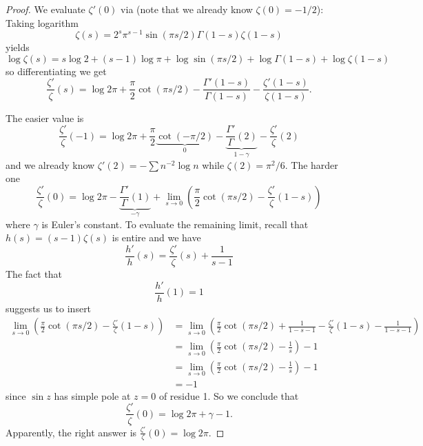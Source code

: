\documentclass[12pt]{article}
\begin{document}
\begin{proof}
We evaluate $\zeta'(0)$ via (note that we already know $\zeta(0) = -1/2$): Taking logarithm
$$\zeta(s) = 2^s \pi^{s - 1} \sin(\pi s / 2) \Gamma(1 - s) \zeta(1 - s)$$
yields
$$\log \zeta(s) = s \log 2 + (s - 1) \log \pi + \log \sin(\pi s / 2) + \log \Gamma(1 - s) + \log \zeta(1 - s)$$
so differentiating we get
$$\frac{\zeta'}{\zeta}(s) = \log 2\pi + \frac\pi2 \cot(\pi s/2) - \frac{\Gamma'(1 - s)}{\Gamma(1 - s)} - \frac{\zeta'(1 - s)}{\zeta(1 - s)}.$$

The easier value is
$$\frac{\zeta'}{\zeta}(-1) = \log 2\pi + \frac\pi2 \underbrace{\cot(-\pi/2)}_0 - \underbrace{\frac{\Gamma'}{\Gamma}(2)}_{1-\gamma} - \frac{\zeta'}{\zeta}(2)$$
and we already know $\zeta'(2) = -\sum n^{-2} \log n$ while $\zeta(2) = \pi^2/6$. The harder one
$$\frac{\zeta'}{\zeta}(0) = \log 2\pi - \underbrace{\frac{\Gamma'}{\Gamma}(1)}_{-\gamma} + \lim_{s \rightarrow 0} \left( \frac\pi2 \cot(\pi s/2) - \frac{\zeta'}{\zeta}(1 - s) \right)$$
where $\gamma$ is Euler's constant. To evaluate the remaining limit, recall that $h(s) = (s - 1)\zeta(s)$ is entire and we have
$$\frac{h'}{h}(s) = \frac{\zeta'}{\zeta}(s) + \frac{1}{s - 1}$$
The fact that
$$\frac{h'}{h}(1) = 1$$
suggests us to insert
\begin{align*}
\lim_{s \rightarrow 0} \left( \frac\pi2 \cot(\pi s/2) - \frac{\zeta'}{\zeta}(1 - s) \right) &= \lim_{s \rightarrow 0} \left( \frac\pi2 \cot(\pi s/2) + \frac{1}{1 - s - 1} - \frac{\zeta'}{\zeta}(1 - s) - \frac{1}{1 - s - 1}\right)\\
&= \lim_{s \rightarrow 0} \left( \frac\pi2 \cot(\pi s/2) - \frac{1}{s}\right) - 1\\
&= \lim_{s \rightarrow 0} \left( \frac\pi2 \cot(\pi s/2) - \frac{1}{s}\right) - 1\\
&= -1
\end{align*}
since $\sin z$ has simple pole at $z = 0$ of residue 1. So we conclude that
$$\frac{\zeta'}{\zeta}(0) = \log 2\pi + \gamma - 1.$$
Apparently, the right answer is $\frac{\zeta'}{\zeta}(0) = \log 2\pi$.
\end{proof}

\unless\ifdefined\IsMainDocument
\end{document}
